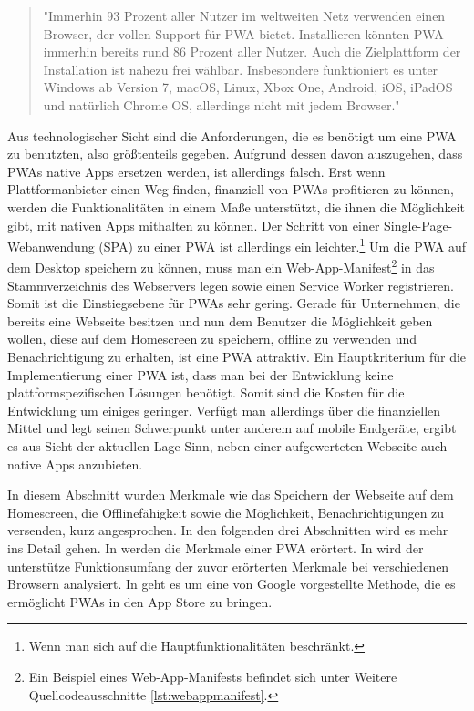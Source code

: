 \begin{quote}
"Immerhin 93 Prozent aller Nutzer im weltweiten Netz verwenden einen Browser, der vollen Support
für PWA bietet. Installieren könnten PWA immerhin bereits rund 86 Prozent aller Nutzer. Auch
die Zielplattform der Installation ist nahezu frei wählbar. Insbesondere funktioniert es
unter Windows ab Version 7, macOS, Linux, Xbox One, Android, iOS, iPadOS und natürlich Chrome OS,
allerdings nicht mit jedem Browser."\cite{T3NPWASupport}
\end{quote}

Aus technologischer Sicht sind die
Anforderungen, die es benötigt um eine PWA zu benutzten, also größtenteils gegeben.
Aufgrund dessen davon auszugehen, dass PWAs native Apps ersetzen werden, ist allerdings
falsch. Erst wenn Plattformanbieter einen Weg finden, finanziell von PWAs profitieren
zu können, werden die Funktionalitäten in einem Maße unterstützt, die ihnen die Möglichkeit
gibt, mit nativen Apps mithalten zu können. Der Schritt von einer Single-Page-Webanwendung (SPA) zu einer
PWA ist allerdings ein leichter.\footnote{Wenn man sich auf die Hauptfunktionalitäten beschränkt.}
Um die PWA auf dem Desktop speichern zu können, muss man ein Web-App-Manifest\footnote{
Ein Beispiel eines Web-App-Manifests befindet sich unter Weitere Quellcodeausschnitte \ref{lst:webappmanifest}.}
in das Stammverzeichnis des Webservers legen sowie einen Service Worker registrieren.
Somit ist die Einstiegsebene für PWAs sehr gering. Gerade für Unternehmen,
die bereits eine Webseite besitzen und nun dem Benutzer die Möglichkeit geben wollen,
diese auf dem Homescreen zu speichern, offline zu verwenden und Benachrichtigung zu erhalten,
ist eine PWA attraktiv. Ein Hauptkriterium für die Implementierung einer PWA ist, dass man bei der Entwicklung
keine plattformspezifischen Lösungen benötigt. Somit sind die Kosten für die Entwicklung um einiges
geringer. Verfügt man allerdings über die finanziellen Mittel und legt seinen Schwerpunkt unter anderem
auf mobile Endgeräte, ergibt es aus Sicht der aktuellen Lage Sinn, neben einer aufgewerteten Webseite
auch native Apps anzubieten.

In diesem Abschnitt wurden Merkmale wie das Speichern der Webseite auf dem Homescreen,
die Offlinefähigkeit sowie die Möglichkeit, Benachrichtigungen zu versenden, kurz angesprochen.
In den folgenden drei Abschnitten wird es mehr ins Detail gehen. In 
werden die Merkmale einer PWA erörtert. In 
wird der unterstütze Funktionsumfang der zuvor erörterten Merkmale bei verschiedenen Browsern
analysiert. In  geht es um eine von Google vorgestellte Methode,
die es ermöglicht PWAs in den App Store zu bringen.

